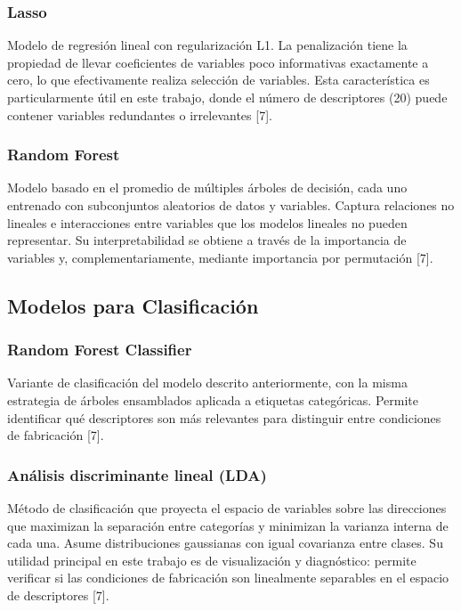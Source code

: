 \subsubsection{Lasso} 
Modelo de regresión lineal con regularización L1. La penalización tiene la propiedad de llevar coeficientes de variables poco informativas exactamente a cero, lo que efectivamente realiza selección de variables. Esta característica es particularmente útil en este trabajo, donde el número de descriptores (20) puede contener variables redundantes o irrelevantes [7].


\subsubsection{Random Forest}
Modelo basado en el promedio de múltiples árboles de decisión, cada uno entrenado con subconjuntos aleatorios de datos y variables. Captura relaciones no lineales e interacciones entre variables que los modelos lineales no pueden representar. Su interpretabilidad se obtiene a través de la importancia de variables y, complementariamente, mediante importancia por permutación [7].

\subsection{Modelos para Clasificación}

\subsubsection{Random Forest Classifier} 
Variante de clasificación del modelo descrito anteriormente, con la misma estrategia de árboles ensamblados aplicada a etiquetas categóricas. Permite identificar qué descriptores son más relevantes para distinguir entre condiciones de fabricación [7].

\subsubsection{Análisis discriminante lineal (LDA)} 
Método de clasificación que proyecta el espacio de variables sobre las direcciones que maximizan la separación entre categorías y minimizan la varianza interna de cada una. Asume distribuciones gaussianas con igual covarianza entre clases. Su utilidad principal en este trabajo es de visualización y diagnóstico: permite verificar si las condiciones de fabricación son linealmente separables en el espacio de descriptores [7].

